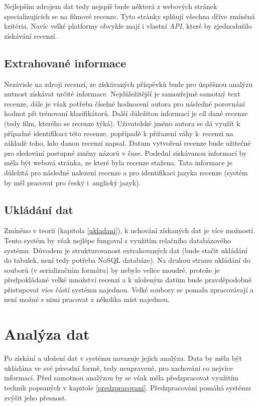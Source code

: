 Nejlepším zdrojem dat tedy nejspíš bude některá z webových stránek specializujících se na filmové recenze. Tyto stránky splňují všechna dříve zmíněná kritéria. Navíc velké platformy obvykle  mají i vlastní \emph{API}, které by zjednodušilo získávání recenzí. 

\subsection{Extrahované informace}
Nezávisle na zdroji recenzí, ze získávaných příspěvků bude pro úspěšnou analýzu nutnost získávat určité informace. Nejdůležitější je samozřejmě samotný text recenze, dále je však potřeba číselné hodnocení autora pro následné porovnání hodnot při trénovaní klasifikátorů. Další důležitou informací je cíl dané recenze (tedy film, kterého se recenze týká). Uživatelské jméno autora se dá využít k případné identifikaci této recenze, popřípadě k přiřazení váhy k~recenzi na základě toho, kdo danou recenzi napsal. Datum vytvoření recenze bude užitečné pro sledování postupné změny názorů v čase. Poslední získávanou informací by měla být webová stránka, ze které byla recenze stažena. Tato informace je důležitá pro následné nalezení recenze a pro identifikaci jazyka recenze (systém by měl pracovat pro český i~anglický jazyk).

\subsection{Ukládání dat}
Zmíněno v teorii (kapitola \ref{ukladani}), k uchování získaných dat je více možností. Tento systém by však nejlépe fungoval s využitím relačního databázového systému. Důvodem je strukturovanost extrahovaných dat (bude stačit ukládání do tabulek, není tedy potřeba NoSQL databáze). Na druhou stranu ukládání do souborů (v serializačním formátu) by nebylo velice moudré, protože je předpokládané velké množství recenzí a k uloženým datům bude pravděpodobně přistupovat více částí systému najednou. Velké soubory se pomalu zpracovávají a není možné s nimi pracovat z několika míst najednou. 

\section{Analýza dat}
Po získání a uložení dat v systému navazuje jejich analýza. Data by měla být ukládána ve své původní formě, tedy neupravené, pro zachování co nejvíce informací. Před samotnou analýzou by se však měla předzpracovat využitím technik popsaných v kapitole \ref{predzpracovani}. Předzpracování pomáhá systému zvýšit jeho přesnost. 

